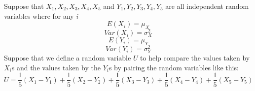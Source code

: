 \documentclass[addpoints]{examsetup}
\begin{document}
\begin{questions}
\newpage
\question
 Suppose that $X_1, X_2, X_3, X_4, X_5$ and $Y_1, Y_2, Y_3, Y_4, Y_5$ are all independent random variables where for any $i$
   $$E(X_i) = \mu_X$$
   $$Var(X_i) = \sigma_X^2$$
   $$E(Y_i) = \mu_Y$$
   $$Var(Y_i) = \sigma_Y^2$$
   Suppose that we define a random variable $U$ to help compare the values taken by $X_i$s and the values taken by the $Y_i$s by pairing the random variables like this:
   $$U = \frac{1}{5}(X_1 - Y_1) + \frac{1}{5}(X_2 - Y_2) + \frac{1}{5}(X_3 - Y_3) + \frac{1}{5}(X_4 - Y_4) + \frac{1}{5}(X_5 - Y_5) $$
\end{questions}
\end{document}
